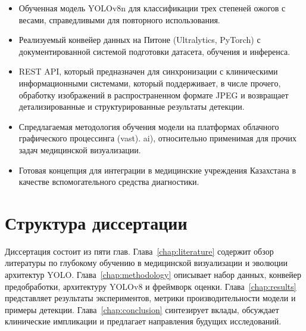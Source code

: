 \begin{itemize}
\item Обученная модель YOLOv8n для классификации трех степеней ожогов с весами, справедливыми для повторного использования. \item Реализуемый конвейер данных на Питоне (Ultralytics, PyTorch) с документированной системой подготовки датасета, обучения и инференса. \item REST API, который предназначен для синхронизации с клиническими информационными системами, который поддерживает, в числе прочего, обработку изображений в распространенном формате JPEG и возвращает детализированные и структурированные результаты детекции.
\item Спредлагаемая методология обучения модели на платформах облачного графического процессинга (vast). ai), относительно применимая для прочих задач медицинской визуализации.
\item Готовая концепция для интеграции в медицинские учреждения Казахстана в качестве вспомогательного средства диагностики.
\end{itemize}

\section{Структура диссертации}

Диссертация состоит из пяти глав. Глава~\ref{chap:literature} содержит обзор литературы по глубокому обучению в медицинской визуализации и эволюции архитектур YOLO. Глава~\ref{chap:methodology} описывает набор данных, конвейер предобработки, архитектуру YOLOv8 и фреймворк оценки. Глава~\ref{chap:results} представляет результаты экспериментов, метрики производительности модели и примеры детекции. Глава~\ref{chap:conclusion} синтезирует вклады, обсуждает клинические импликации и предлагает направления будущих исследований.
